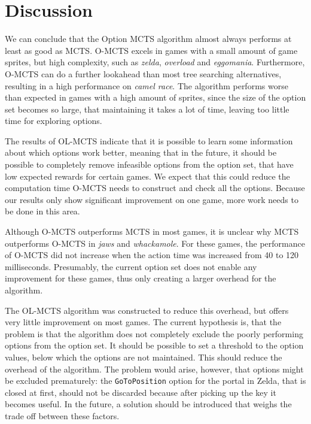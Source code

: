 \chapter{Discussion}
\label{sec:conclusion}



We can conclude that the Option MCTS algorithm almost always performs at least
as good as MCTS. O-MCTS excels in games with a small amount of game sprites, but
high complexity, such as \textit{zelda}, \textit{overload} and \textit{eggomania}.
Furthermore, O-MCTS can do a further lookahead than most tree searching
alternatives, resulting in a high performance on \textit{camel race}. The
algorithm performs worse than expected in games with a high amount of sprites,
since the size of the option set becomes so large, that maintaining it takes a
lot of time, leaving too little time for exploring options. 

The results of OL-MCTS indicate that it is possible to learn some information
about which options work better, meaning that in the future, it should be
possible to completely remove infeasible options from the option set, that have
low expected rewards for certain games. We expect that this could reduce the
computation time O-MCTS needs to construct and check all the options.
Because our results only show significant improvement on one game, more work
needs to be done in this area.

Although O-MCTS outperforms MCTS in most games, it is unclear why MCTS
outperforms O-MCTS in \textit{jaws} and \textit{whackamole}. For these games,
the performance of O-MCTS did not increase when the action time was increased
from 40 to 120 milliseconds. Presumably, the current option set does not enable
any improvement for these games, thus only creating a larger overhead for the
algorithm.

The OL-MCTS algorithm was constructed to reduce this overhead, but offers very
little improvement on most games. The current hypothesis is, that the problem is
that the algorithm does not completely exclude the poorly performing options
from the option set. It should be possible to set a threshold to the option
values, below which the options are not maintained. This should reduce the
overhead of the algorithm. The problem would arise, however, that options might
be excluded prematurely: the \texttt{GoToPosition} option for the portal in
Zelda, that is closed at first, should not be discarded because after picking up
the key it becomes useful. In the future, a solution should be introduced that
weighs the trade off between these factors.

